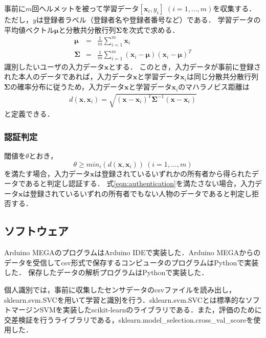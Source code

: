 \documentclass[Japanese,noauthor]{dicomopapers}
\begin{document}
事前に$m$回ヘルメットを被って学習データ$[\bm{x}_i,y_i]$ $(i=1,\dots, m)$を収集する．ただし，$y$は登録者ラベル（登録者名や登録者番号など）である．
学習データの平均値ベクトル$\bm{\mu}$と分散共分散行列$\bm{\Sigma}$を次式で求める．
\begin{eqnarray}
  \bm{\mu} &=& \frac{1}{m}\sum_{i=1}^{m}\bm{x}_i \\
  \bm{\Sigma} &=& \frac{1}{m}\sum_{i=1}^{m}(\bm{x}_i-\bm{\mu})(\bm{x}_i-\bm{\mu})^T
\end{eqnarray}
識別したいユーザの入力データ$\bm{x}$とする．
このとき，入力データが事前に登録された本人のデータであれば，入力データ$\bm{x}$と学習データ$\bm{x}_i$は同じ分散共分散行列$\bm{\Sigma}$の確率分布に従うため，入力データ$\bm{x}$と学習データ$\bm{x}_i$のマハラノビス距離は
\begin{eqnarray}
  d(\bm{x},\bm{x}_i) = \sqrt{(\bm{x}-\bm{x}_i)^{T}\bm{\Sigma}^{-1}(\bm{x}-\bm{x}_i)}
\end{eqnarray}
と定義できる．

\subsubsection{認証判定}
閾値を$\theta$とおき，
\begin{equation}
\label{eqn:authentication}
  \theta \geq min_i(d(\bm{x},\bm{x}_i))~(i=1,\dots,m)
\end{equation}
を満たす場合，入力データ$\bm{x}$は登録されているいずれかの所有者から得られたデータであると判定し認証する．
式\ref{eqn:authentication}を満たさない場合，入力データ$\bm{x}$は登録されているいずれの所有者でもない人物のデータであると判定し拒否する．

\subsection{ソフトウェア}
Arduino MEGAのプログラムはArduino IDEで実装した．Arduino MEGAからのデータを受信してcsv形式で保存するコンピュータのプログラムはPythonで実装した．
保存したデータの解析プログラムはPythonで実装した．

個人識別では，事前に収集したセンサデータのcsvファイルを読み出し，sklearn.svm.SVCを用いて学習と識別を行う．sklearn.svm.SVCとは標準的なソフトマージンSVMを実装したscikit-learn\cite{scikit-learn}のライブラリである．また，評価のために交差検証を行うライブラリである，sklearn.model\_selection.cross\_val\_scoreを使用した．
\end{document}
